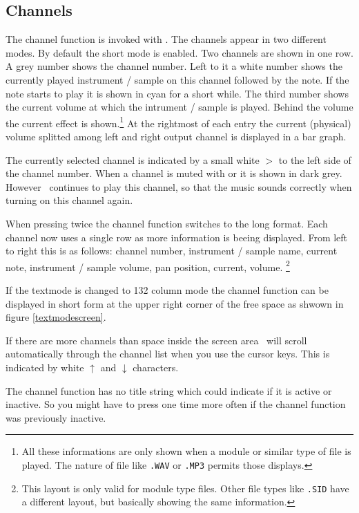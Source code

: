 \subsection{Channels}
The channel function is invoked with . The channels appear in
two different modes. By default the short mode is enabled. Two
channels are shown in one row. A grey number shows the channel
number. Left to it a white number shows the currently played
instrument / sample on this channel followed by the note. If the note
starts to play it is shown in cyan for a short while.  The third
number shows the current volume at which the intrument / sample is
played. Behind the volume the current effect is shown.\footnote{All
these informations are only shown when a module or similar type of
file is played.  The nature of file like \texttt{.WAV} or
\texttt{.MP3} permits those displays.}  At the rightmost of each entry
the current (physical) volume splitted among left and right output
channel is displayed in a bar graph.

The currently selected channel is indicated by a small white $>$ to
the left side of the channel number. When a channel is muted with
 or  it is shown in dark grey. However \cp\ continues
to play this channel, so that the music sounds correctly when turning
on this channel again.

When pressing  twice the channel function switches to the long
format.  Each channel now uses a single row as more information is
beeing displayed.  From left to right this is as follows: channel
number, instrument / sample name, current note, instrument / sample
volume, pan position, current, volume.
\footnote{This layout is only valid for module type files. Other file types
like \texttt{.SID} have a different layout, but basically showing the
same information.}

If the textmode is changed to 132 column mode the channel function can
be displayed in short form at the upper right corner of the free space
as shwown in figure \ref{textmodescreen}.

If there are more channels than space inside the screen area \cp\ will
scroll automatically through the channel list when you use the cursor
keys. This is indicated by white $\uparrow$ and $\downarrow$
characters.

{\small The channel function has no title string which could indicate
if it is active or inactive. So you might have to press  one
time more often if the channel function was previously inactive.}

